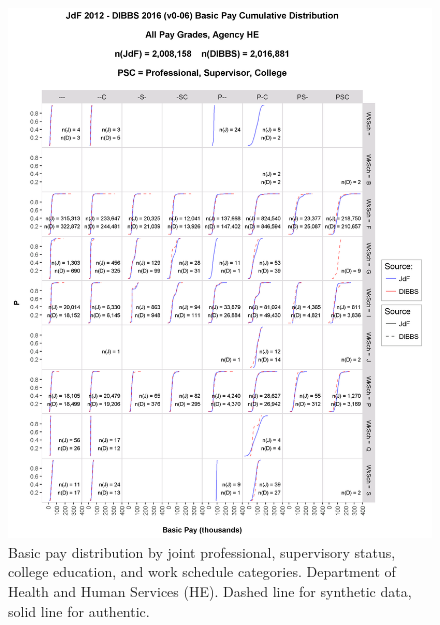 \documentclass[10pt, letterpaper]{article}
\begin{document}
\begin{spacing}{1.0}
\begin{figure}[h]
    \centering
    \includegraphics[width=6.5in, trim={0 0 1in 1.5in}, clip]{JdFDIBBSBasicPayCDFHE.png}
    \caption{Basic pay distribution by joint professional, supervisory status, college education, and work schedule  categories.  Department of Health and Human Services (HE).  Dashed line for synthetic data, solid line for authentic.}
    \label{figure:JdFDIBBSBasicPayCDFHE}
\end{figure}

\clearpage


\end{spacing}
\end{document}
